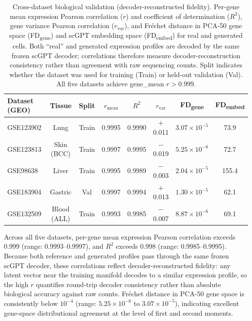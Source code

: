 \documentclass[preprint,12pt]{elsarticle}
\begin{document}
\begin{table}[!htbp]
\caption{Cross-dataset biological validation (decoder-reconstructed fidelity). Per-gene mean expression Pearson correlation ($r$) and coefficient of determination ($R^2$), gene variance Pearson correlation ($r_\text{var}$), and Fr\'{e}chet distance in PCA-50 gene space (FD\textsubscript{gene}) and scGPT embedding space (FD\textsubscript{embed}) for real and generated cells. Both ``real'' and generated expression profiles are decoded by the same frozen scGPT decoder; correlations therefore measure decoder-reconstruction consistency rather than agreement with raw sequencing counts. Split indicates whether the dataset was used for training (Train) or held-out validation (Val). All five datasets achieve gene\_mean $r > 0.999$.\label{tab:cross-dataset}}
\centering
\small
\begin{tabular}{lccccccc}
\toprule
\textbf{Dataset (GEO)} & \textbf{Tissue} & \textbf{Split} & \textbf{$r_\text{mean}$} & \textbf{$R^2$} & \textbf{$r_\text{var}$} & \textbf{FD\textsubscript{gene}} & \textbf{FD\textsubscript{embed}} \\
\midrule
GSE123902 & Lung     & Train & 0.9995 & 0.9990 & $+$0.011  & $3.07 \times 10^{-5}$ & 73.9 \\
GSE123813 & Skin (BCC)  & Train & 0.9997 & 0.9995 & $-$0.019  & $5.25 \times 10^{-6}$ & 72.7 \\
GSE98638  & Liver    & Train & 0.9995 & 0.9989 & $-$0.003  & $2.04 \times 10^{-5}$ & 155.4 \\
GSE183904 & Gastric  & Val & 0.9997 & 0.9994 & $+$0.013  & $1.30 \times 10^{-5}$ & 62.1 \\
GSE132509 & Blood (ALL)  & Train & 0.9993 & 0.9985 & $-$0.007  & $8.87 \times 10^{-6}$ & 69.1 \\
\bottomrule
\end{tabular}
\end{table}

Across all five datasets, per-gene mean expression Pearson correlation exceeds 0.999 (range: 0.9993--0.9997), and $R^2$ exceeds 0.998 (range: 0.9985--0.9995). Because both reference and generated profiles pass through the same frozen scGPT decoder, these correlations reflect decoder-reconstructed fidelity: any latent vector near the training manifold decodes to a similar expression profile, so the high $r$ quantifies round-trip decoder consistency rather than absolute biological accuracy against raw counts. Fr\'{e}chet distance in PCA-50 gene space is consistently below $10^{-4}$ (range: $5.25 \times 10^{-6}$ to $3.07 \times 10^{-5}$), indicating excellent gene-space distributional agreement at the level of first and second moments.
\end{document}
